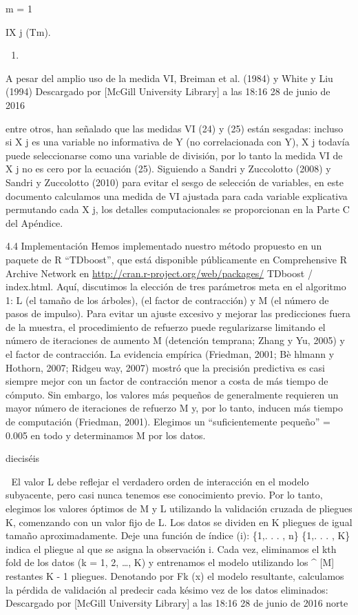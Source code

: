 \documentclass[]{article}
\begin{document}
m = 1

IX j (Tm).

\begin{enumerate}
\def\labelenumi{(\arabic{enumi})}
\setcounter{enumi}{24}
\item
\end{enumerate}

A pesar del amplio uso de la medida VI, Breiman et al. (1984) y White y
Liu (1994) Descargado por {[}McGill University Library{]} a las 18:16 28
de junio de 2016

entre otros, han señalado que las medidas VI (24) y (25) están sesgadas:
incluso si X j es una variable no informativa de Y (no correlacionada
con Y), X j todavía puede seleccionarse como una variable de división,
por lo tanto la medida VI de X j no es cero por la ecuación (25).
Siguiendo a Sandri y Zuccolotto (2008) y Sandri y Zuccolotto (2010) para
evitar el sesgo de selección de variables, en este documento calculamos
una medida de VI ajustada para cada variable explicativa permutando cada
X j, los detalles computacionales se proporcionan en la Parte C del
Apéndice.

4.4 Implementación Hemos implementado nuestro método propuesto en un
paquete de R ``TDboost'', que está disponible públicamente en
Comprehensive R Archive Network en
\url{http://cran.r-project.org/web/packages/} TDboost / index.html.
Aquí, discutimos la elección de tres parámetros meta en el algoritmo 1:
L (el tamaño de los árboles), (el factor de contracción) y M (el número
de pasos de impulso). Para evitar un ajuste excesivo y mejorar las
predicciones fuera de la muestra, el procedimiento de refuerzo puede
regularizarse limitando el número de iteraciones de aumento M (detención
temprana; Zhang y Yu, 2005) y el factor de contracción. La evidencia
empírica (Friedman, 2001; Bè hlmann y Hothorn, 2007; Ridgeu way, 2007)
mostró que la precisión predictiva es casi siempre mejor con un factor
de contracción menor a costa de más tiempo de cómputo. Sin embargo, los
valores más pequeños de generalmente requieren un mayor número de
iteraciones de refuerzo M y, por lo tanto, inducen más tiempo de
computación (Friedman, 2001). Elegimos un ``suficientemente pequeño'' =
0.005 en todo y determinamos M por los datos.

dieciséis

 El valor L debe reflejar el verdadero orden de interacción en el
modelo subyacente, pero casi nunca tenemos ese conocimiento previo. Por
lo tanto, elegimos los valores óptimos de M y L utilizando la validación
cruzada de pliegues K, comenzando con un valor fijo de L. Los datos se
dividen en K pliegues de igual tamaño aproximadamente. Deje una función
de índice (i): \{1,. . . , n\} \{1,. . . , K\} indica el pliegue al que
se asigna la observación i. Cada vez, eliminamos el kth fold de los
datos (k = 1, 2, \ldots{}, K) y entrenamos el modelo utilizando los \^{}
{[}M{]} restantes K - 1 pliegues. Denotando por Fk (x) el modelo
resultante, calculamos la pérdida de validación al predecir cada késimo
vez de los datos eliminados: Descargado por {[}McGill University
Library{]} a las 18:16 28 de junio de 2016 norte
\end{document}
